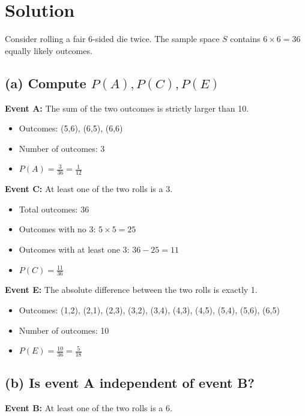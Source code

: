 \documentclass{article}
\begin{document}
\section*{Solution}

Consider rolling a fair 6-sided die twice. The sample space \( S \) contains \( 6 \times 6 = 36 \) equally likely outcomes.

\subsection*{(a) Compute \( P(A), P(C), P(E) \)}

\textbf{Event A:} The sum of the two outcomes is strictly larger than 10.

\begin{itemize}
    \item Outcomes: (5,6), (6,5), (6,6)
    \item Number of outcomes: 3
    \item \( P(A) = \frac{3}{36} = \frac{1}{12} \)
\end{itemize}

\textbf{Event C:} At least one of the two rolls is a 3.

\begin{itemize}
    \item Total outcomes: 36
    \item Outcomes with no 3: \( 5 \times 5 = 25 \)
    \item Outcomes with at least one 3: \( 36 - 25 = 11 \)
    \item \( P(C) = \frac{11}{36} \)
\end{itemize}

\textbf{Event E:} The absolute difference between the two rolls is exactly 1.

\begin{itemize}
    \item Outcomes: (1,2), (2,1), (2,3), (3,2), (3,4), (4,3), (4,5), (5,4), (5,6), (6,5)
    \item Number of outcomes: 10
    \item \( P(E) = \frac{10}{36} = \frac{5}{18} \)
\end{itemize}

\subsection*{(b) Is event A independent of event B?}

\textbf{Event B:} At least one of the two rolls is a 6.
\end{document}

